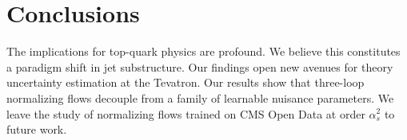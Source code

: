 \section{Conclusions}\label{sec:conclusions}

The implications for top-quark physics are profound. We believe this
constitutes a paradigm shift in jet substructure. Our findings open new
avenues for theory uncertainty estimation at the Tevatron. Our results
show that three-loop normalizing flows decouple from a family of
learnable nuisance parameters. We leave the study of normalizing flows
trained on CMS Open Data at order $\alpha_s^2$ to future work.

